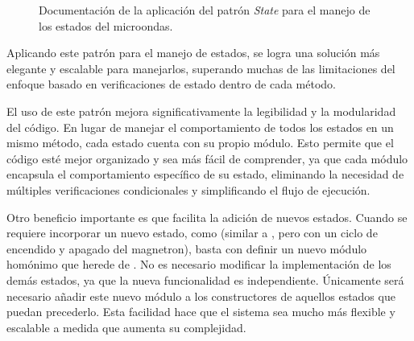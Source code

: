 \begin{figure}[H]
\caption{Documentación de la aplicación del patrón \textit{State} para el manejo de los estados del microondas.}
\label{docState}
\end{figure}


Aplicando este patrón para el manejo de estados, se logra una solución más elegante y escalable para manejarlos, superando muchas de las limitaciones del enfoque basado en verificaciones de estado dentro de cada método.

El uso de este patrón mejora significativamente la legibilidad y la modularidad del código. En lugar de manejar el comportamiento de todos los estados en un mismo método, cada estado cuenta con su propio módulo. Esto permite que el código esté mejor organizado y sea más fácil de comprender, ya que cada módulo encapsula el comportamiento específico de su estado, eliminando la necesidad de múltiples verificaciones condicionales y simplificando el flujo de ejecución.


Otro beneficio importante es que facilita la adición de nuevos estados. Cuando se requiere incorporar un nuevo estado, como \Descongelando (similar a \Calentando, pero con un ciclo de encendido y apagado del \gls{magnetron}), basta con definir un nuevo módulo homónimo que herede de \EstadoMicroondas. No es necesario modificar la implementación de los demás estados, ya que la nueva funcionalidad es independiente. Únicamente será necesario añadir este nuevo módulo a los constructores de aquellos estados que puedan precederlo. Esta facilidad hace que el sistema sea mucho más flexible y escalable a medida que aumenta su complejidad.

